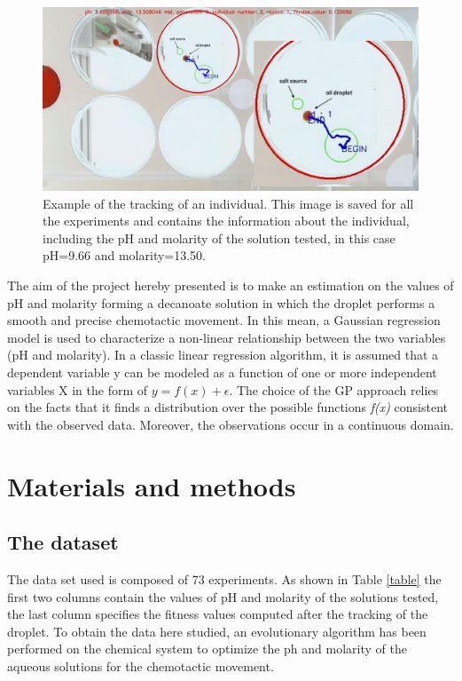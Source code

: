 \documentclass[a4paper]{article}
\begin{document}
\begin{figure}
	\centering
	\includegraphics[width=1\textwidth]{droplet_screen2.jpg}
	\caption{Example of the tracking of an individual. This image is saved for all the experiments and contains the information about the individual, including the pH and molarity of the solution tested, in this case pH=9.66 and molarity=13.50.}
	\label{fig:droplet_screen}
\end{figure}

The aim of the project hereby presented is to make an estimation on the values of pH and molarity forming a decanoate solution in which the droplet performs a smooth and precise chemotactic movement. In this mean, a Gaussian regression model is used to characterize a non-linear relationship between the two variables (pH and molarity).
In a classic linear regression algorithm, it is assumed that a dependent variable y can be modeled as a function of one or more independent variables X in the form of $y=f(x)+\epsilon$.
The choice of the GP approach relies on the facts that it finds a distribution over the possible functions \textit{f(x)} consistent with the observed data. Moreover, the observations occur in a continuous domain. 
\newpage
\section{Materials and methods}

\subsection{The dataset}
The data set used is composed of 73 experiments. As shown in Table \ref{table} the first two columns contain the values of pH and molarity of the solutions tested, the last column specifies the fitness values computed after the tracking of the droplet. 
To obtain the data here studied, an evolutionary algorithm has been performed on the chemical system to optimize the ph and molarity of the aqueous solutions for the chemotactic movement. 
\end{document}
